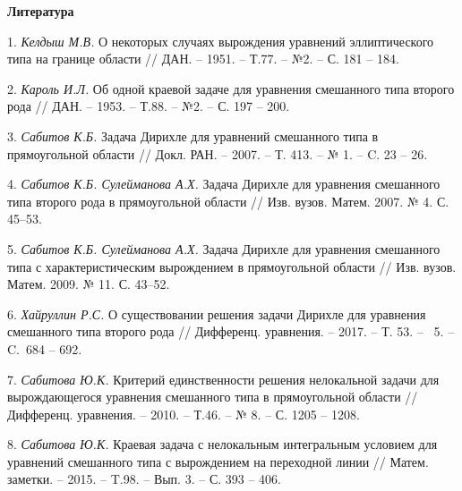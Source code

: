 \smallskip \centerline {\bf Литература} \nopagebreak

1. {\it Келдыш М.В.} О некоторых случаях вырождения уравнений
эллиптического типа на границе области // ДАН. -- 1951. -- Т.77.
-- №2. -- С. 181 -- 184.

2. {\it Кароль И.Л.} Об одной краевой задаче для уравнения
смешанного типа второго рода
  // ДАН. -- 1953. -- Т.88. -- №2. -- С. 197 -- 200.

3. {\it Сабитов К.Б.} Задача Дирихле для уравнений смешанного
типа в прямоугольной области // Докл. РАН. -- 2007. -- Т. 413. --
№ 1. -- C. 23 -- 26.

4. {\it Сабитов К.Б. Сулейманова А.Х.} Задача Дирихле для уравнения смешанного типа второго рода в прямоугольной области // Изв. вузов. Матем. 2007. № 4. С. 45--53.

5. {\it Сабитов К.Б. Сулейманова А.Х.} Задача Дирихле для уравнения смешанного типа с характеристическим вырождением в прямоугольной области // Изв. вузов. Матем. 2009. № 11. С. 43--52.

6. {\it Хайруллин Р.С.} О существовании решения задачи Дирихле
для уравнения смешанного типа второго рода
// Дифференц. уравнения. -- 2017. -- Т. 53. -- \No~5. -- C.~684 -- 692.

7. {\it Сабитова Ю.К.} Критерий единственности решения
нелокальной задачи для вырождающегося уравнения смешанного типа в
прямоугольной области // Дифференц. уравнения. -- 2010. -- Т.46.
-- № 8. -- С. 1205 -- 1208.

8. {\it Сабитова Ю.К.} Краевая задача с нелокальным интегральным
условием для уравнений смешанного типа с вырождением на переходной
линии // Матем. заметки. -- 2015. -- T.98. -- Вып. 3. -- С. 393 --
406.
